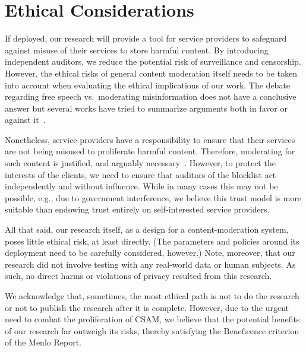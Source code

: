 \documentclass[sigconf]{acmart}
\begin{document}

\maketitle







%



\newpage
\section{Ethical Considerations}
%
If deployed, our research will provide a tool for service providers to
safeguard against misuse of their services to store harmful
content. By introducing independent auditors, we reduce the potential
risk of surveillance and censorship. However, the ethical risks of
general content moderation itself needs to be taken into account when
evaluating the ethical implications of our work. The debate regarding
free speech vs.\ moderating misinformation does not have a conclusive
answer but several works have tried to summarize arguments both in
favor or against it~\cite{kozyreva2023resolving}.

Nonetheless, service providers have a responsibility to ensure that
their services are not being misused to proliferate harmful
content. Therefore, moderating for such content is justified, and
arguably necessary~\cite{howard2023ethics}. However, to protect the
interests of the clients, we need to ensure that auditors of the
blocklist act independently and without influence. While in many cases
this may not be possible, e.g., due to government interference, we
believe this trust model is more suitable than endowing trust entirely
on self-interested service providers.

All that said, our research itself, as a design for a
content-moderation system, poses little ethical risk, at least
directly.  (The parameters and policies around its deployment need to
be carefully considered, however.)  Note, moreover, that our research
did not involve testing with any real-world data or human subjects. As
such, no direct harms or violations of privacy resulted from this
research.

We acknowledge that, sometimes, the most ethical path is not to do the
research or not to publish the research after it is complete. However,
due to the urgent need to combat the proliferation of CSAM, we believe
that the potential benefits of our research far outweigh its risks,
thereby satisfying the Beneficence criterion of the Menlo Report.
\end{document}
